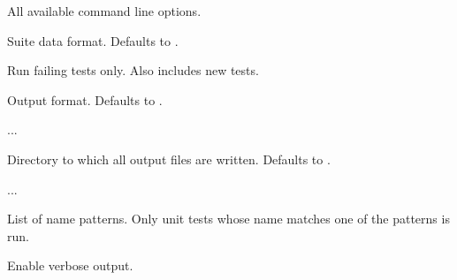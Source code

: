 All available command line options.


Suite data format. Defaults to .


Run failing tests only. Also includes new tests.


Output format. Defaults to .


...


Directory to which all output files are written. Defaults to .


...


List of name patterns. Only unit tests whose name matches one of the patterns is run.


Enable verbose output.